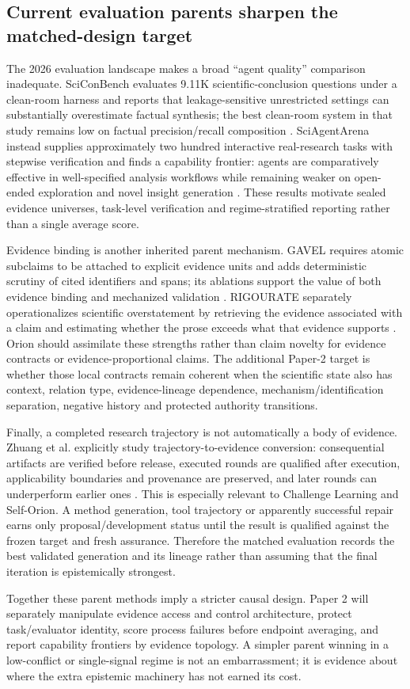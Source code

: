 \subsection{Current evaluation parents sharpen the matched-design target}

The 2026 evaluation landscape makes a broad ``agent quality'' comparison inadequate. SciConBench evaluates 9.11K scientific-conclusion questions under a clean-room harness and reports that leakage-sensitive unrestricted settings can substantially overestimate factual synthesis; the best clean-room system in that study remains low on factual precision/recall composition \cite{jung2026scicon}. SciAgentArena instead supplies approximately two hundred interactive real-research tasks with stepwise verification and finds a capability frontier: agents are comparatively effective in well-specified analysis workflows while remaining weaker on open-ended exploration and novel insight generation \cite{liu2026sciagentarena}. These results motivate sealed evidence universes, task-level verification and regime-stratified reporting rather than a single average score.

Evidence binding is another inherited parent mechanism. GAVEL requires atomic subclaims to be attached to explicit evidence units and adds deterministic scrutiny of cited identifiers and spans; its ablations support the value of both evidence binding and mechanized validation \cite{xu2026gavel}. RIGOURATE separately operationalizes scientific overstatement by retrieving the evidence associated with a claim and estimating whether the prose exceeds what that evidence supports \cite{james2026rigourate}. Orion should assimilate these strengths rather than claim novelty for evidence contracts or evidence-proportional claims. The additional Paper-2 target is whether those local contracts remain coherent when the scientific state also has context, relation type, evidence-lineage dependence, mechanism/identification separation, negative history and protected authority transitions.

Finally, a completed research trajectory is not automatically a body of evidence. Zhuang et al. explicitly study trajectory-to-evidence conversion: consequential artifacts are verified before release, executed rounds are qualified after execution, applicability boundaries and provenance are preserved, and later rounds can underperform earlier ones \cite{zhuang2026trajectory}. This is especially relevant to Challenge Learning and Self-Orion. A method generation, tool trajectory or apparently successful repair earns only proposal/development status until the result is qualified against the frozen target and fresh assurance. Therefore the matched evaluation records the best validated generation and its lineage rather than assuming that the final iteration is epistemically strongest.

Together these parent methods imply a stricter causal design. Paper 2 will separately manipulate evidence access and control architecture, protect task/evaluator identity, score process failures before endpoint averaging, and report capability frontiers by evidence topology. A simpler parent winning in a low-conflict or single-signal regime is not an embarrassment; it is evidence about where the extra epistemic machinery has not earned its cost.
